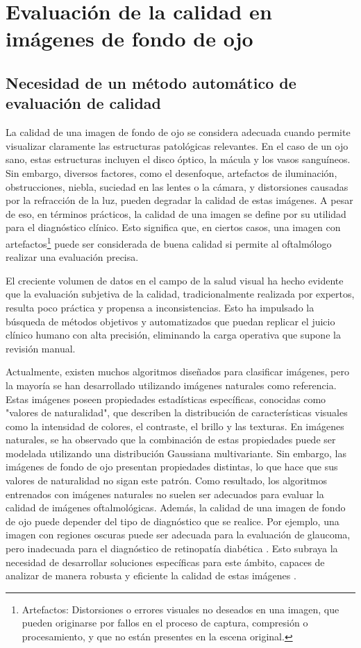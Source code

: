 \chapter{Evaluación de la calidad en imágenes de fondo de ojo}


\section{Necesidad de un método automático de evaluación de calidad}
La calidad de una imagen de fondo de ojo se considera adecuada cuando permite visualizar claramente las estructuras patológicas relevantes. En el caso de un ojo sano, estas estructuras incluyen el disco óptico, la mácula y los vasos sanguíneos. Sin embargo, diversos factores, como el desenfoque, artefactos de iluminación, obstrucciones, niebla, suciedad en las lentes o la cámara, y distorsiones causadas por la refracción de la luz, pueden degradar la calidad de estas imágenes. A pesar de eso, en términos prácticos, la calidad de una imagen se define por su utilidad para el diagnóstico clínico. Esto significa que, en ciertos casos, una imagen con artefactos\footnote{Artefactos: Distorsiones o errores visuales no deseados en una imagen, que pueden originarse por fallos en el proceso de captura, compresión o procesamiento, y que no están presentes en la escena original.
} puede ser considerada de buena calidad si permite al oftalmólogo realizar una evaluación precisa.

El creciente volumen de datos en el campo de la salud visual ha hecho evidente que la evaluación subjetiva de la calidad, tradicionalmente realizada por expertos, resulta poco práctica y propensa a inconsistencias. Esto ha impulsado la búsqueda de métodos objetivos y automatizados que puedan replicar el juicio clínico humano con alta precisión, eliminando la carga operativa que supone la revisión manual.

Actualmente, existen muchos algoritmos diseñados para clasificar imágenes, pero la mayoría se han desarrollado utilizando imágenes naturales como referencia. Estas imágenes poseen propiedades estadísticas específicas, conocidas como "valores de naturalidad", que describen la distribución de características visuales como la intensidad de colores, el contraste, el brillo y las texturas. En imágenes naturales, se ha observado que la combinación de estas propiedades puede ser modelada utilizando una distribución Gaussiana multivariante. Sin embargo, las imágenes de fondo de ojo presentan propiedades distintas, lo que hace que sus valores de naturalidad no sigan este patrón. Como resultado, los algoritmos entrenados con imágenes naturales no suelen ser adecuados para evaluar la calidad de imágenes oftalmológicas. Además, la calidad de una imagen de fondo de ojo puede depender del tipo de diagnóstico que se realice. Por ejemplo, una imagen con regiones oscuras puede ser adecuada para la evaluación de glaucoma, pero inadecuada para el diagnóstico de retinopatía diabética \parencites{giancardo2010}. Esto subraya la necesidad de desarrollar soluciones específicas para este ámbito, capaces de analizar de manera robusta y eficiente la calidad de estas imágenes \parencites{piyasena2018}.

